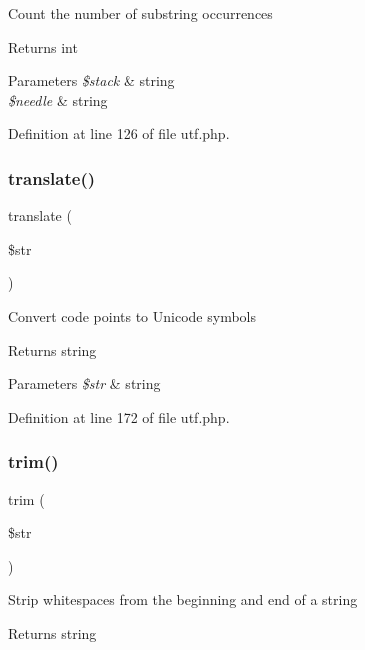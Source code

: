 Count the number of substring occurrences \begin{DoxyReturn}{Returns}
int 
\end{DoxyReturn}

\begin{DoxyParams}{Parameters}
{\em \$stack} & string \\
\hline
{\em \$needle} & string \\
\hline
\end{DoxyParams}


Definition at line 126 of file utf.\+php.

\hypertarget{class_u_t_f_a798f9e9997b8a6f34ff111df63531c08}{}\label{class_u_t_f_a798f9e9997b8a6f34ff111df63531c08} 
\subsubsection{\texorpdfstring{translate()}{translate()}}
{\footnotesize\ttfamily translate (\begin{DoxyParamCaption}\item[{}]{\$str }\end{DoxyParamCaption})}

Convert code points to Unicode symbols \begin{DoxyReturn}{Returns}
string 
\end{DoxyReturn}

\begin{DoxyParams}{Parameters}
{\em \$str} & string \\
\hline
\end{DoxyParams}


Definition at line 172 of file utf.\+php.

\hypertarget{class_u_t_f_a432e7b973a6e6bfa55cced21e75ee29e}{}\label{class_u_t_f_a432e7b973a6e6bfa55cced21e75ee29e} 
\subsubsection{\texorpdfstring{trim()}{trim()}}
{\footnotesize\ttfamily trim (\begin{DoxyParamCaption}\item[{}]{\$str }\end{DoxyParamCaption})}

Strip whitespaces from the beginning and end of a string \begin{DoxyReturn}{Returns}
string 
\end{DoxyReturn}

